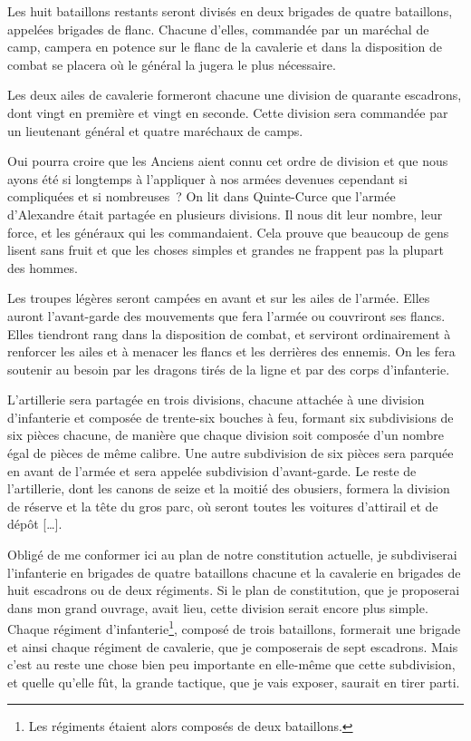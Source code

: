 \documentclass[french,twoside]{book} %
\begin{document}
Les huit bataillons restants seront divisés en deux brigades de quatre bataillons, appelées brigades de flanc. Chacune d’elles, commandée par un maréchal de camp, campera en potence sur le flanc de la cavalerie et dans la disposition de combat se placera où le général la jugera le plus nécessaire.\par
Les deux ailes de cavalerie formeront chacune une division de quarante escadrons, dont vingt en première et vingt en seconde. Cette division sera commandée par un lieutenant général et quatre maréchaux de camps.\par
Oui pourra croire que les Anciens aient connu cet ordre de division et que nous ayons été si longtemps à l’appliquer à nos armées devenues cependant si compliquées et si nombreuses ? On lit dans Quinte-Curce que l’armée d’Alexandre était partagée en plusieurs divisions. Il nous dit leur nombre, leur force, et les généraux qui les commandaient. Cela prouve que beaucoup de gens lisent sans fruit et que les choses simples et grandes ne frappent pas la plupart des hommes.\par
Les troupes légères seront campées en avant et sur les ailes de l’armée. Elles auront l’avant-garde des mouvements que fera l’armée ou couvriront ses flancs. Elles tiendront rang dans la disposition de combat, et serviront ordinairement à renforcer les ailes et à menacer les flancs et les derrières des ennemis. On les fera soutenir au besoin par les dragons tirés de la ligne et par des corps d’infanterie.\par
L’artillerie sera partagée en trois divisions, chacune attachée à une division d’infanterie et composée de trente-six bouches à feu, formant six subdivisions de six pièces chacune, de manière que chaque division soit composée d’un nombre égal de pièces de même calibre. Une autre subdivision de six pièces sera parquée en avant de l’armée et sera appelée subdivision d’avant-garde. Le reste de l’artillerie, dont les canons de seize et la moitié des obusiers, formera la division de réserve et la tête du gros parc, où seront toutes les voitures d’attirail et de dépôt […].\par
Obligé de me conformer ici au plan de notre constitution actuelle, je subdiviserai l’infanterie en brigades de quatre bataillons chacune et la cavalerie en brigades de huit escadrons ou de deux régiments. Si le plan de constitution, que je proposerai dans mon grand ouvrage, avait lieu, cette division serait encore plus simple. Chaque régiment d’infanterie\footnote{Les régiments étaient alors composés de deux bataillons.}, composé de trois bataillons, formerait une brigade et ainsi chaque régiment de cavalerie, que je composerais de sept escadrons. Mais c’est au reste une chose bien peu importante en elle-même que cette subdivision, et quelle qu’elle fût, la grande tactique, que je vais exposer, saurait en tirer parti.\par
\end{document}
